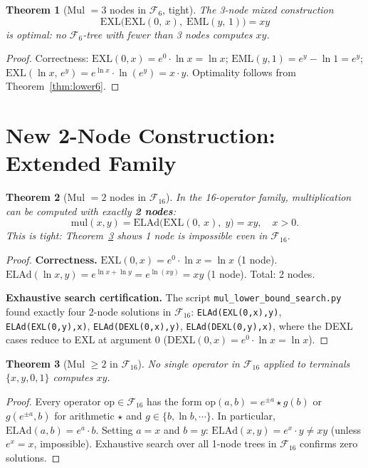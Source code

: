 \documentclass[11pt]{article}
\newtheorem{theorem}{Theorem}
\begin{document}
\begin{theorem}[Mul $= 3$ nodes in $\mathcal{F}_6$, tight]\label{thm:tight6}
The 3-node mixed construction
\[
\mathrm{EXL}\!\bigl(\mathrm{EXL}(0,\,x),\; \mathrm{EML}(y,\,1)\bigr) = xy
\]
is optimal: no $\mathcal{F}_6$-tree with fewer than 3 nodes computes $xy$.
\end{theorem}

\begin{proof}
Correctness: $\mathrm{EXL}(0,x) = e^0 \cdot \ln x = \ln x$;
$\mathrm{EML}(y,1) = e^y - \ln 1 = e^y$;
$\mathrm{EXL}(\ln x,\, e^y) = e^{\ln x} \cdot \ln(e^y) = x \cdot y$.
Optimality follows from Theorem~\ref{thm:lower6}.
\end{proof}

\section{New 2-Node Construction: Extended Family}

\begin{theorem}[Mul $= 2$ nodes in $\mathcal{F}_{16}$]\label{thm:2node16}
In the 16-operator family, multiplication can be computed with exactly \textbf{2
nodes}:
\[
\boxed{\mathrm{mul}(x,y) = \mathrm{ELAd}\!\bigl(\mathrm{EXL}(0,\,x),\; y\bigr) = xy,
\quad x > 0.}
\]
This is tight: Theorem~\ref{thm:lower1} shows 1 node is impossible even in
$\mathcal{F}_{16}$.
\end{theorem}

\begin{proof}
\textbf{Correctness.}
$\mathrm{EXL}(0,x) = e^0 \cdot \ln x = \ln x$ (1 node).
$\mathrm{ELAd}(\ln x, y) = e^{\ln x + \ln y} = e^{\ln(xy)} = xy$ (1 node).
Total: 2 nodes.

\textbf{Exhaustive search certification.}  The script
\texttt{mul\_lower\_bound\_search.py} found exactly four 2-node solutions in
$\mathcal{F}_{16}$:
\texttt{ELAd(EXL(0,x),y)}, \texttt{ELAd(EXL(0,y),x)},
\texttt{ELAd(DEXL(0,x),y)}, \texttt{ELAd(DEXL(0,y),x)},
where the DEXL cases reduce to EXL at argument 0
($\mathrm{DEXL}(0,x) = e^0 \cdot \ln x = \ln x$).
\end{proof}

\begin{theorem}[Mul $\geq 2$ in $\mathcal{F}_{16}$]\label{thm:lower1}
No single operator in $\mathcal{F}_{16}$ applied to terminals $\{x,y,0,1\}$
computes $xy$.
\end{theorem}

\begin{proof}
Every operator $\mathrm{op} \in \mathcal{F}_{16}$ has the form
$\mathrm{op}(a,b) = e^{\pm a} \star g(b)$ or $g(e^{\pm a}, b)$ for arithmetic
$\star$ and $g \in \{b, \ln b, \cdots\}$.  In particular, $\mathrm{ELAd}(a,b) = e^a
\cdot b$.  Setting $a = x$ and $b = y$: $\mathrm{ELAd}(x,y) = e^x \cdot y \neq xy$
(unless $e^x = x$, impossible).  Exhaustive search over all 1-node trees in
$\mathcal{F}_{16}$ confirms zero solutions.
\end{proof}
\end{document}
